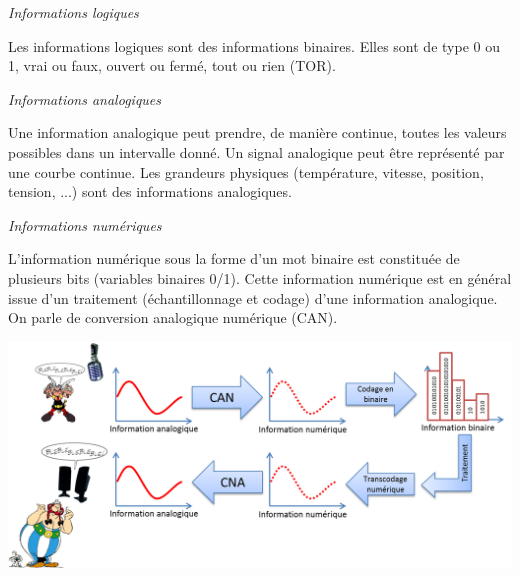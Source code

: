 \documentclass[11pt,oneside]{article}
\begin{document}
\begin{defi}
 \textit{\textsf{Informations logiques}}

Les informations logiques sont des informations binaires. Elles sont de type 0
ou 1, vrai ou faux, ouvert ou fermé, tout ou rien (TOR).

\end{defi}

\begin{defi}
 \textit{\textsf{Informations analogiques}}

Une information analogique peut prendre, de manière continue, toutes les valeurs
possibles dans un intervalle donné. Un signal analogique peut être représenté
par une courbe continue. Les grandeurs physiques (température, vitesse,
position, tension, ...) sont des informations analogiques.

\end{defi}


\begin{defi}
 \textit{\textsf{Informations numériques}}

L'information numérique sous la forme d'un mot binaire est constituée de
plusieurs bits (variables binaires 0/1). Cette information numérique est en
général issue d'un traitement (échantillonnage et codage) d'une information
analogique. On parle de conversion analogique numérique (CAN).

\end{defi}


\begin{exemple}
  \begin{center}
    \includegraphics[width=.9\textwidth]{png/info}
  \end{center}
\end{exemple}
\end{document}
